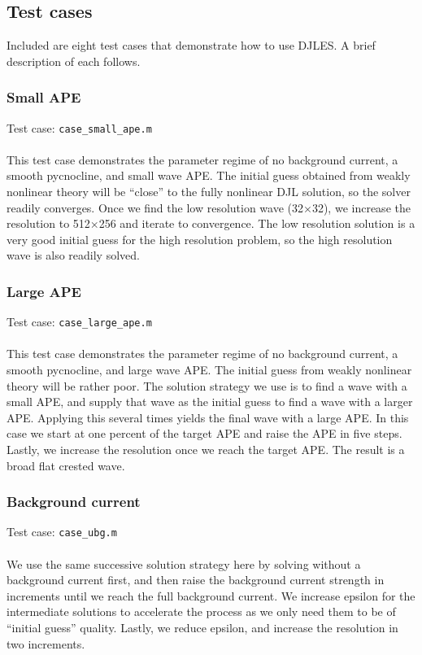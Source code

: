 \documentclass[letterpaper]{article}
\begin{document}
\subsection{Test cases}
Included are eight test cases that demonstrate how to use DJLES. A brief description of each follows.

\subsubsection{Small APE}
Test case: \verb"case_small_ape.m" \\\\
This test case demonstrates the parameter regime of no background current, a smooth pycnocline, and small wave APE.
The initial guess obtained from weakly nonlinear theory will be ``close'' to the fully nonlinear DJL solution, so the solver readily converges.
Once we find the low resolution wave (32$\times$32), we increase the resolution to 512$\times$256 and iterate to convergence.
The low resolution solution is a very good initial guess for the high resolution problem, so the high resolution wave is also readily solved.

\subsubsection{Large APE}
Test case: \verb"case_large_ape.m" \\\\
This test case demonstrates the parameter regime of no background current, a smooth pycnocline, and large wave APE.
The initial guess from weakly nonlinear theory will be rather poor. 
The solution strategy we use is to find a wave with a small APE, and supply that wave as the initial guess to find a wave with a larger APE.
Applying this several times yields the final wave with a large APE.
In this case we start at one percent of the target APE and raise the APE in five steps.
Lastly, we increase the resolution once we reach the target APE.
The result is a broad flat crested wave.

\subsubsection{Background current}
Test case: \verb"case_ubg.m" \\\\
We use the same successive solution strategy here by solving without a background current first,
and then raise the background current strength in increments until we reach the full background current.
We increase epsilon for the intermediate solutions to accelerate the process as we only need them to be of ``initial guess'' quality.
Lastly, we reduce epsilon, and increase the resolution in two increments.
\end{document}
